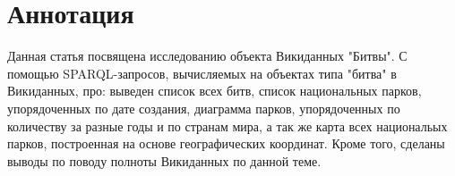 \section{Аннотация}

Данная статья посвящена исследованию объекта Викиданных "Битвы". С помощью SPARQL-запросов, вычисляемых на объектах типа "битва" в Викиданных, про: выведен список всех битв, список национальных парков, упорядоченных по дате создания, диаграмма парков, упорядоченных по количеству за разные годы и по странам мира, а так же карта всех национальых парков, построенная на основе географических координат. Кроме того, сделаны выводы по поводу полноты Викиданных по данной теме.
